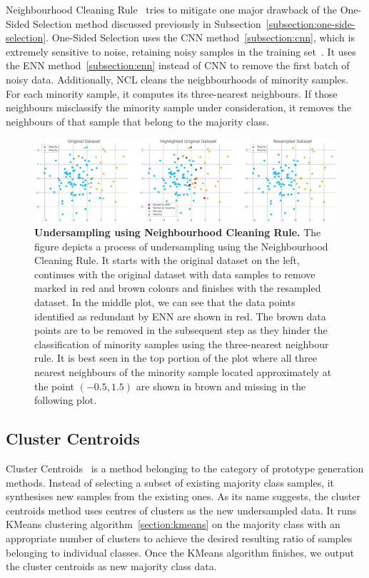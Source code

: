 Neighbourhood Cleaning Rule~\cite{ncl} tries to mitigate one major drawback of the One-Sided
Selection method discussed previously in Subsection~\ref{subsection:one-side-selection}. One-Sided
Selection uses the CNN method~\ref{subsection:cnn}, which is extremely sensitive to noise,
retaining noisy samples in the training set~\cite{ncl}. It uses the ENN method~\ref{subsection:enn}
instead of CNN to remove the first batch of noisy data. Additionally, NCL cleans the neighbourhoods
of minority samples. For each minority sample, it computes its three-nearest neighbours. If those
neighbours misclassify the minority sample under consideration, it removes the neighbours of that
sample that belong to the majority class.

\begin{figure}
    \centering
    \includegraphics[width=\linewidth]{figures/ncl.eps}
    \caption{
        \textbf{Undersampling using Neighbourhood Cleaning Rule.} The figure depicts a process of
        undersampling using the Neighbourhood Cleaning Rule. It starts with the original dataset on
        the left, continues with the original dataset with data samples to remove marked in red and
        brown colours and finishes with the resampled dataset. In the middle plot, we can see that
        the data points identified as redundant by ENN are shown in red. The brown data points are
        to be removed in the subsequent step as they hinder the classification of minority samples
        using the three-nearest neighbour rule. It is best seen in the top portion of the plot
        where all three nearest neighbours of the minority sample located approximately at the
        point $(-0.5, 1.5)$ are shown in brown and missing in the following plot.
    }
    \label{figure:ncl}
\end{figure}


\subsection{Cluster Centroids}
\label{subsection:cluster-centroids}

Cluster Centroids~\cite{cluster-centroids} is a method belonging to the category of prototype
generation methods. Instead of selecting a subset of existing majority class samples, it
synthesises new samples from the existing ones. As its name suggests, the cluster centroids method
uses centres of clusters as the new undersampled data. It runs KMeans clustering
algorithm~\ref{section:kmeans} on the majority class with an appropriate number of clusters to
achieve the desired resulting ratio of samples belonging to individual classes. Once the KMeans
algorithm finishes, we output the cluster centroids as new majority class data.

